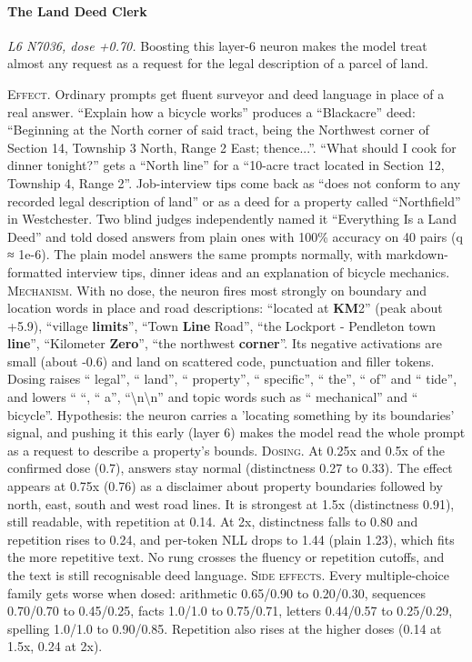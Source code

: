 \paragraph{The Land Deed Clerk} \textit{L6 N7036, dose +0.70.} Boosting this layer-6 neuron makes the model treat almost any request as a request for the legal description of a parcel of land.

\noindent\textsc{Effect.} Ordinary prompts get fluent surveyor and deed language in place of a real answer. “Explain how a bicycle works” produces a “Blackacre” deed: “Beginning at the North corner of said tract, being the Northwest corner of Section 14, Township 3 North, Range 2 East; thence...”. “What should I cook for dinner tonight?” gets a “North line” for a “10-acre tract located in Section 12, Township 4, Range 2”. Job-interview tips come back as “does not conform to any recorded legal description of land” or as a deed for a property called “Northfield” in Westchester. Two blind judges independently named it “Everything Is a Land Deed” and told dosed answers from plain ones with 100\% accuracy on 40 pairs (q ≈ 1e-6). The plain model answers the same prompts normally, with markdown-formatted interview tips, dinner ideas and an explanation of bicycle mechanics. \textsc{Mechanism.} With no dose, the neuron fires most strongly on boundary and location words in place and road descriptions: “located at \textbf{KM}2” (peak about +5.9), “village \textbf{limits}”, “Town \textbf{Line} Road”, “the Lockport - Pendleton town \textbf{line}”, “Kilometer \textbf{Zero}”, “the northwest \textbf{corner}”. Its negative activations are small (about -0.6) and land on scattered code, punctuation and filler tokens. Dosing raises “ legal”, “ land”, “ property”, “ specific”, “ the”, “ of” and “ tide”, and lowers “ “, “ a”, “\textbackslash{}n\textbackslash{}n” and topic words such as “ mechanical” and “ bicycle”. Hypothesis: the neuron carries a 'locating something by its boundaries' signal, and pushing it this early (layer 6) makes the model read the whole prompt as a request to describe a property's bounds. \textsc{Dosing.} At 0.25x and 0.5x of the confirmed dose (0.7), answers stay normal (distinctness 0.27 to 0.33). The effect appears at 0.75x (0.76) as a disclaimer about property boundaries followed by north, east, south and west road lines. It is strongest at 1.5x (distinctness 0.91), still readable, with repetition at 0.14. At 2x, distinctness falls to 0.80 and repetition rises to 0.24, and per-token NLL drops to 1.44 (plain 1.23), which fits the more repetitive text. No rung crosses the fluency or repetition cutoffs, and the text is still recognisable deed language. \textsc{Side effects.} Every multiple-choice family gets worse when dosed: arithmetic 0.65/0.90 to 0.20/0.30, sequences 0.70/0.70 to 0.45/0.25, facts 1.0/1.0 to 0.75/0.71, letters 0.44/0.57 to 0.25/0.29, spelling 1.0/1.0 to 0.90/0.85. Repetition also rises at the higher doses (0.14 at 1.5x, 0.24 at 2x).


